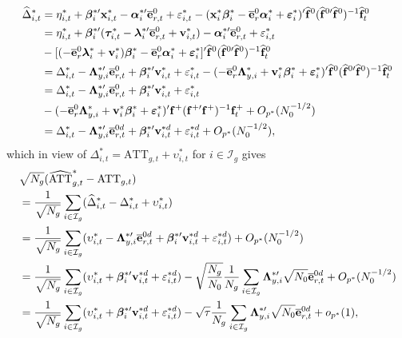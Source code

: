 \documentclass[12pt,fleqn]{article}
\begin{document}
\begin{align}
\widehat \Delta_{i,t}^* &  = \eta_{i,t}^* + \boldsymbol{\beta}_i^{*\prime}\mathbf{x}_{i,t}^* - \boldsymbol{\alpha}_i^{*\prime}\overline{\mathbf{e}}_{r,t}^0 + \varepsilon_{i,t}^{*} - ( \mathbf{x}_{i}^*\boldsymbol{\beta}_i^* - \overline{\mathbf{e}}_{r}^0\boldsymbol{\alpha}_i^* +  \boldsymbol{\varepsilon}_{i}^* )' \widehat{\mathbf{f}}^{0} (\widehat{\mathbf{f}}^{0\prime}\widehat{\mathbf{f}}^0)^{-1}\widehat{\mathbf{f}}_t^0 \notag\\
& = \eta_{i,t}^* + \boldsymbol{\beta}_i^{*\prime}(\boldsymbol{\tau}_{i,t}^*  - \boldsymbol{\lambda}_i^{*\prime}\overline{\mathbf{e}}_{r,t}^0  + \mathbf{v}_{i,t}^*) - \boldsymbol{\alpha}_i^{*\prime}\overline{\mathbf{e}}_{r,t}^0 + \varepsilon_{i,t}^*\notag\\
& - [ (- \overline{\mathbf{e}}_{r}^0\boldsymbol{\lambda}_i^*  + \mathbf{v}_i^*)\boldsymbol{\beta}_i^*  - \overline{\mathbf{e}}_{r}^0\boldsymbol{\alpha}_i^* +  \boldsymbol{\varepsilon}_{i}^* ]' \widehat{\mathbf{f}}^{0} (\widehat{\mathbf{f}}^{0\prime}\widehat{\mathbf{f}}^0)^{-1}\widehat{\mathbf{f}}_t^0 \notag\\
& = \Delta_{i,t}^* - \boldsymbol{\Lambda}_{y,i}^{*\prime}\overline{\mathbf{e}}_{r,t}^0 + \boldsymbol{\beta}_i^{*\prime}\mathbf{v}_{i,t}^* + \varepsilon_{i,t}^*  - ( - \overline{\mathbf{e}}_{r}^0\boldsymbol{\Lambda}_{y,i}^* + \mathbf{v}_i^*\boldsymbol{\beta}_i^* +  \boldsymbol{\varepsilon}_{i}^* )' \widehat{\mathbf{f}}^{0} (\widehat{\mathbf{f}}^{0\prime}\widehat{\mathbf{f}}^0)^{-1}\widehat{\mathbf{f}}_t^0  \notag\\
& = \Delta_{i,t}^* - \boldsymbol{\Lambda}_{y,i}^{*\prime}\overline{\mathbf{e}}_{r,t}^0 + \boldsymbol{\beta}_i^{*\prime}\mathbf{v}_{i,t}^* + \varepsilon_{i,t}^*  \notag\\
& - ( - \overline{\mathbf{e}}_{r}^0\boldsymbol{\Lambda}_{y,i}^* + \mathbf{v}_i^*\boldsymbol{\beta}_i^* +  \boldsymbol{\varepsilon}_{i}^*)' \mathbf{f}^{+} (\mathbf{f}^{+\prime}\mathbf{f}^+)^{-1}\mathbf{f}_t^+ + O_{p^*}(N_0^{-1/2})  \notag\\
& = \Delta_{i,t}^* - \boldsymbol{\Lambda}_{y,i}^{*\prime}\overline{\mathbf{e}}_{r,t}^{0d} + \boldsymbol{\beta}_i^{*\prime}\mathbf{v}_{i,t}^{*d} + \varepsilon_{i,t}^{*d} + O_{p^*}(N_0^{-1/2}) ,
\end{align}
which in view of $\Delta_{i,t}^*= \mathrm{ATT}_{g,t} + \upsilon_{i,t}^*$ for $i\in \mathcal{I}_g$ gives
\begin{align}
& \sqrt{N_g}(\widehat{\mathrm{ATT}}_{g,t}^* - \mathrm{ATT}_{g,t}) \notag\\
& = \frac{1}{\sqrt{N_g}} \sum_{i\in \mathcal{I}_g} (\widehat \Delta_{i,t}^* - \Delta_{i,t}^* + \upsilon_{i,t}^*) \notag\\
& = \frac{1}{\sqrt{N_g}} \sum_{i\in \mathcal{I}_g} (\upsilon_{i,t}^* - \boldsymbol{\Lambda}_{y,i}^{*\prime}\overline{\mathbf{e}}_{r,t}^{0d} + \boldsymbol{\beta}_i^{*\prime}\mathbf{v}_{i,t}^{*d} + \varepsilon_{i,t}^{*d} ) + O_{p^*}(N_0^{-1/2})\notag\\
&= \frac{1}{\sqrt{N_g}}\sum_{i\in \mathcal{I}_g}(\upsilon_{i,t}^*  + \boldsymbol{\beta}_i^{*\prime}\mathbf{v}_{i,t}^{*d} + \varepsilon_{i,t}^{*d}) - \sqrt{\frac{N_g}{N_0}} \frac{1}{N_g}\sum_{i\in \mathcal{I}_g} \boldsymbol{\Lambda}_{y,i}^{*\prime}\sqrt{N_0}\overline{\mathbf{e}}_{r,t}^{0d} + O_{p^*}(N_0^{-1/2}) \notag\\
&= \frac{1}{\sqrt{N_g}}\sum_{i\in \mathcal{I}_g}(\upsilon_{i,t}^*  + \boldsymbol{\beta}_i^{*\prime}\mathbf{v}_{i,t}^{*d} + \varepsilon_{i,t}^{*d}) - \sqrt{\tau} \frac{1}{N_g}\sum_{i\in \mathcal{I}_g} \boldsymbol{\Lambda}_{y,i}^{*\prime}\sqrt{N_0}\overline{\mathbf{e}}_{r,t}^{0d} + o_{p^*}(1) ,
\end{align}
\end{document}
